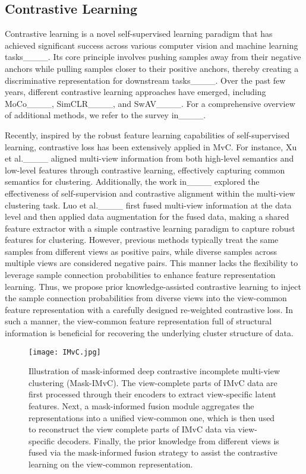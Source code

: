 \subsection{Contrastive Learning}

Contrastive learning is a novel self-supervised learning paradigm that has achieved significant success across various computer vision and machine learning tasks____. Its core principle involves pushing samples away from their negative anchors while pulling samples closer to their positive anchors, thereby creating a discriminative representation for downstream tasks____. Over the past few years, different contrastive learning approaches have emerged, including MoCo____, SimCLR____, and SwAV____. For a comprehensive overview of additional methods, we refer to the survey in____. 

Recently, inspired by the robust feature learning capabilities of self-supervised learning, contrastive loss has been extensively applied in MvC. For instance, Xu et al.____ aligned multi-view information from both high-level semantics and low-level features through contrastive learning, effectively capturing common semantics for clustering. Additionally, the work in____ explored the effectiveness of self-supervision and contrastive alignment within the multi-view clustering task. Luo et al.____ first fused multi-view information at the data level and then applied data augmentation for the fused data, making a shared feature extractor with a simple contrastive learning paradigm to capture robust features for clustering. However, previous methods typically treat the same samples from different views as positive pairs, while diverse samples across multiple views are considered negative pairs. This manner lacks the flexibility to leverage sample connection probabilities to enhance feature representation learning. Thus, we propose prior knowledge-assisted contrastive learning to inject the sample connection probabilities from diverse views into the view-common feature representation with a carefully designed re-weighted contrastive loss. In such a manner, the view-common feature representation full of structural information is beneficial for recovering the underlying cluster structure of data.


\begin{figure*}[!htbp]
	\centering
	\texttt{[image: IMvC.jpg]}
	\caption{Illustration of mask-informed deep contrastive incomplete multi-view clustering (Mask-IMvC). The view-complete parts of IMvC data are first processed through their encoders to extract view-specific latent features. Next, a mask-informed fusion module aggregates the representations into a unified view-common one, which is then used to reconstruct the view complete parts of IMvC data via view-specific decoders. Finally, the prior knowledge from different views is fused via the mask-informed fusion strategy to assist the contrastive learning on the view-common representation.}
	\label{fig:IMvC}
\end{figure*}